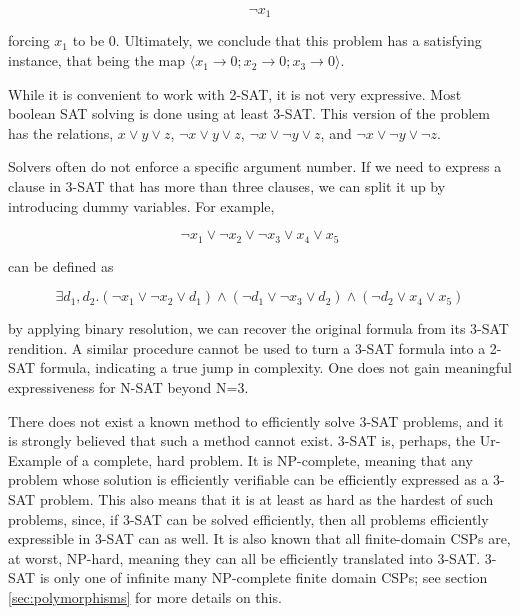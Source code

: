 \begin{equation}\label{equation:two-sat-example-pt3}
\neg x_1
\end{equation}

forcing $x_1$ to be $0$. Ultimately, we conclude that this problem has a satisfying instance, that being the map $\langle x_1 \rightarrow 0; x_2 \rightarrow 0; x_3 \rightarrow 0\rangle$.

While it is convenient to work with 2-SAT, it is not very expressive. Most boolean SAT solving is done using at least 3-SAT. This version of the problem has the relations, $x \vee y \vee z$, $\neg x \vee y \vee z$, $\neg x \vee \neg y \vee z$, and $\neg x \vee \neg y \vee \neg z$.

Solvers often do not enforce a specific argument number. If we need to express a clause in 3-SAT that has more than three clauses, we can split it up by introducing dummy variables. For example,

\begin{equation}\label{equation:three-sat-split-pt1}
\neg x_1 \vee \neg x_2 \vee \neg x_3 \vee x_4 \vee x_5
\end{equation}

can be defined as

\begin{equation}\label{equation:three-sat-split-pt1}
\exists d_1, d_2. (\neg x_1 \vee \neg x_2 \vee d_1) \wedge (\neg d_1 \vee \neg x_3 \vee d_2) \wedge (\neg d_2 \vee x_4 \vee x_5)
\end{equation}

by applying binary resolution, we can recover the original formula from its 3-SAT rendition. A similar procedure cannot be used to turn a 3-SAT formula into a 2-SAT formula, indicating a true jump in complexity. One does not gain meaningful expressiveness for N-SAT beyond N=3.

There does not exist a known method to efficiently solve 3-SAT problems, and it is strongly believed that such a method cannot exist. 3-SAT is, perhaps, the Ur-Example of a complete, hard problem. It is NP-complete, meaning that any problem whose solution is efficiently verifiable can be efficiently expressed as a 3-SAT problem. This also means that it is at least as hard as the hardest of such problems, since, if 3-SAT can be solved efficiently, then all problems efficiently expressible in 3-SAT can as well. It is also known that all finite-domain CSPs are, at worst, NP-hard, meaning they can all be efficiently translated into 3-SAT. 3-SAT is only one of infinite many NP-complete finite domain CSPs; see section \ref{sec:polymorphisms} for more details on this.

